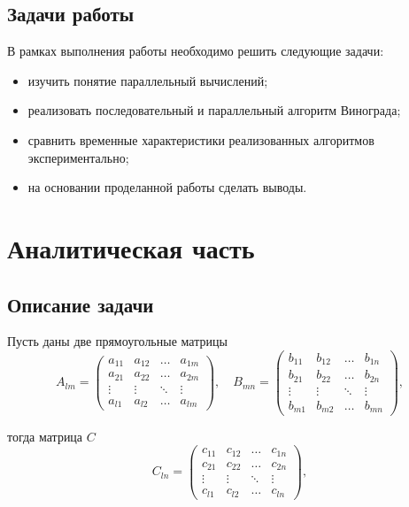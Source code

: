 \documentclass[a4paper,14pt]{extreport}
\begin{document}
\section*{Задачи работы}

В рамках выполнения работы необходимо решить следующие задачи:
\begin{itemize}
	\item изучить понятие параллельный вычислений;
	\item реализовать последовательный и параллельный алгоритм Винограда;
	\item сравнить временные характеристики реализованных алгоритмов экспериментально;
	\item на основании проделанной работы сделать выводы.
\end{itemize}


\chapter{Аналитическая часть}

\section{Описание задачи}


Пусть даны две прямоугольные матрицы
\begin{equation}
	A_{lm} = \begin{pmatrix}
		a_{11} & a_{12} & \ldots & a_{1m}\\
		a_{21} & a_{22} & \ldots & a_{2m}\\
		\vdots & \vdots & \ddots & \vdots\\
		a_{l1} & a_{l2} & \ldots & a_{lm}
	\end{pmatrix},
	\quad
	B_{mn} = \begin{pmatrix}
		b_{11} & b_{12} & \ldots & b_{1n}\\
		b_{21} & b_{22} & \ldots & b_{2n}\\
		\vdots & \vdots & \ddots & \vdots\\
		b_{m1} & b_{m2} & \ldots & b_{mn}
	\end{pmatrix},
\end{equation}

тогда матрица $C$
\begin{equation}
	C_{ln} = \begin{pmatrix}
		c_{11} & c_{12} & \ldots & c_{1n}\\
		c_{21} & c_{22} & \ldots & c_{2n}\\
		\vdots & \vdots & \ddots & \vdots\\
		c_{l1} & c_{l2} & \ldots & c_{ln}
	\end{pmatrix},
\end{equation}
\end{document}
